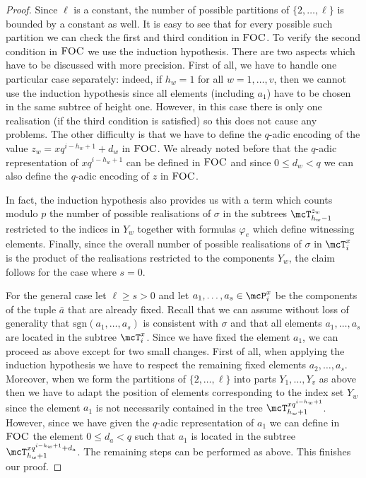 \documentclass[a4paper,UKenglish]{lipics}
\newcommand{\sgn}{\ensuremath{\textrm{sgn}}}
\newcommand{\logic}[1]{\ensuremath{\textsc{#1}}\xspace}
\newcommand{\FOC}{\logic{FOC}}
\renewcommand{\phi}{\varphi}
\newcommand{\ba}{{\bar a}}
\theoremstyle{plain}
\begin{document}
\begin{proof}
Since $\ell$ is a constant, the number of possible partitions of $\{2,
\dots, \ell \}$ is bounded by a constant as well. It is easy to see that for
every possible such partition we can check the first and third
condition in $\FOC$. 
To verify the second condition in $\FOC$ we use the induction 
hypothesis. 
There are two aspects which have to be discussed with more precision. First of
all, we have to handle one particular case separately: indeed, if $h_w = 1$
for all $w = 1, \dots, v$, then we cannot use the induction
hypothesis since all elements (including $a_1$) have to be chosen in the 
same subtree of height one.
However, in this case there is only one realisation (if the third condition is
satisfied) so this does not cause any problems.
The other difficulty is that we have to define the $q$-adic encoding of the
value $z_w={xq^{i-h_w+1}+d_w}$ in $\FOC$. 
We already noted before 
that the $q$-adic representation of $xq^{i-h_w+1}$ can be defined in $\FOC$ and
since $0 \leq d_w < q$ we can also define the $q$-adic encoding of $z$ in
$\FOC$.

In fact, the induction hypothesis also provides us with a term which counts
modulo $p$ the number of possible realisations of $\sigma$ in the subtrees 
$\mcT_{h_w-1}^{z_w}$ restricted to the indices in $Y_w$ together
with formulas $\phi_e$ which define witnessing elements. 
Finally, since the overall number of possible realisations of $\sigma$ in
$\mcT_i^x$ is the product of the realisations restricted to the components
$Y_w$, the claim follows for the case where $s = 0$. 

For the general case let $\ell \geq s > 0$ and let $a_1, \dots, a_s \in
\mcP_i^x$ be the components of the tuple $\ba$ that are already fixed. 
Recall that we can assume without loss of generality that 
$\sgn(a_1, \dots, a_s)$ is consistent with $\sigma$ and that
all elements $a_1, \dots, a_s$ are located in the subtree $\mcT_i^x$.
Since we have fixed the element $a_1$, we can proceed as above except for two
small changes. First of all, when applying the induction hypothesis we have 
to respect the remaining fixed elements $a_2, \dots, a_s$. Moreover, when we
form the partitions of $\{2, \dots, \ell \}$ into parts $Y_1, \dots, Y_v$ as
above then we have to adapt the position of elements corresponding to the index
set $Y_w$ since the element $a_1$ is not necessarily contained in the tree
$\mcT_{h_w+1}^{xq^{i-h_w+1}}$. However, since we have given the $q$-adic
representation of $a_1$ we can define in $\FOC$ the element $0 \leq d_a < q$
such that $a_1$ is located in the subtree $\mcT_{h_w+1}^{xq^{i-h_w+1}+d_a}$. 
The remaining steps can be performed as above. This finishes our proof.
\end{proof}
\end{document}
